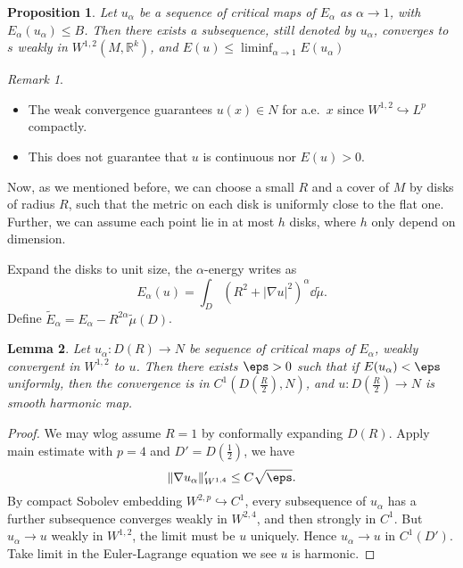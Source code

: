 \documentclass[UTF8,12pt]{article}
\theoremstyle{plain}\newtheorem{theorem}{Theorem}
\theoremstyle{definition}\newtheorem{definition}[theorem]{Definition}
\theoremstyle{definition}\newtheorem{example}[theorem]{Example}
\theoremstyle{plain}\newtheorem{axiom}[theorem]{Axiom}
\theoremstyle{plain}\newtheorem{assertion}[theorem]{Assertion}
\theoremstyle{plain}\newtheorem{corollary}[theorem]{Corollary}
\theoremstyle{plain}\newtheorem{lemma}[theorem]{Lemma}
\theoremstyle{plain}\newtheorem{proposition}[theorem]{Proposition}
\theoremstyle{plain}\newtheorem{prop}[theorem]{Proposition}
\theoremstyle{plain}\newtheorem{conjecture}[theorem]{Conjecture}
\theoremstyle{plain}\newtheorem{conj}[theorem]{Conjecture}
\theoremstyle{plain}\newtheorem{problem}[theorem]{Problem}
\theoremstyle{remark}\newtheorem{notation}[theorem]{Notation}
\theoremstyle{definition}\newtheorem*{question}{Question}
\theoremstyle{definition}\newtheorem*{answer}{Answer}
\theoremstyle{definition}\newtheorem*{goal}{Goal}
\theoremstyle{plain}\newtheorem*{application}{Application}
\theoremstyle{plain}\newtheorem*{exercise}{Exercise}
\theoremstyle{remark}\newtheorem*{remark}{Remark}
\theoremstyle{remark}\newtheorem*{note}{\small{Note}}
\numberwithin{equation}{section}
\numberwithin{theorem}{section}
\numberwithin{figure}{section}
\begin{document}
\begin{prop}
    Let \(u_\alpha\) be a sequence of critical maps of \(E_\alpha\) as \(\alpha\to 1\),
    with \(E_\alpha(u_\alpha)\le B\). Then there exists a subsequence, still denoted
    by \(u_\alpha\), converges to \(s\) weakly in \(W^{1,2}(M,\mathbb{R}^k)\),
    and \(E(u)\le \liminf_{\alpha\to 1}E(u_\alpha)\)
\end{prop}
\begin{remark}\hfill
\begin{itemize}
\item The weak convergence guarantees \(u(x)\in N\) for a.e.\ \(x\) since 
    \(W^{1,2}\hookrightarrow L^p\) compactly.
\item This does not guarantee that \(u\) is continuous nor \(E(u)>0\).
\end{itemize}
\end{remark}

Now, as we mentioned before, we can choose a small \(R\) and a cover of \(M\) by disks
of radius \(R\), such that the metric on each disk is uniformly close to the flat one.
Further, we can assume each point lie in at most \(h\) disks, where \(h\) only depend
on dimension.

Expand the disks to unit size, the \(\alpha\)-energy writes as \[
    E_\alpha(u)=\int_{D}(R^2+|\nabla u|^2)^\alpha\dd{\tilde{\mu}}
.\] Define \(\tilde{E}_\alpha=E_\alpha-R^{2\alpha}\tilde{\mu}(D)\).

\begin{lemma}\label{lem:small-energy-converge}
    Let \(u_\alpha\colon D(R)\to N\) be sequence of critical maps of \(E_\alpha\),
    weakly convergent in \(W^{1,2}\) to \(u\). Then there exists \(\eps>0\) such that
    if \(E(u_\alpha)<\eps\) uniformly, then the convergence is in
    \(C^1(D(\frac{R}{2}),N)\), and \(u\colon D(\frac{R}{2})\to N\) is smooth harmonic
    map.
\end{lemma}
\begin{proof}
    We may wlog assume \(R=1\) by conformally expanding \(D(R)\). Apply main estimate
    with \(p=4\) and \(D'=D(\frac{1}{2})\), we have \[
        \|\nabla u_\alpha\|_{W^{1,4}}'\le C\sqrt{\eps}
    .\] By compact Sobolev embedding \(W^{2,p}\hookrightarrow C^1\), every subsequence
    of \(u_\alpha\) has a further subsequence converges weakly in \(W^{2,4}\), and then
    strongly in \(C^1\). But \(u_\alpha\to u\) weakly in \(W^{1,2}\), the limit must
    be \(u\) uniquely. Hence \(u_\alpha\to u\) in \(C^1(D')\). Take limit in the
    Euler-Lagrange equation we see \(u\) is harmonic.
\end{proof}
\end{document}
